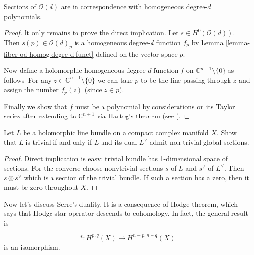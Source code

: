 \documentclass{book}
\begin{document}
\begin{theorem}
\label{theorem-secti-od-degre-d-homog-poly}
Sections of $\mathcal{O}(d)$ are in
correspondence with homogeneous degree-$d$
polynomials.
\end{theorem}

\begin{proof}
It only remains to prove the direct
implication.
Let $s \in H^0(\mathcal{O}(d))$.
Then $s(p) \in \mathcal{O}(d)_p$ is a
homogeneous degree-$d$ function $f_p$
by Lemma
\ref{lemma-fiber-od-homog-degre-d-funct}
defined on the vector space $p$.

Now define a holomorphic homogeneous
degree-$d$ function $f$ on
$\mathbb{C}^{n+1}\setminus\{0\}$ as follows.
For any $z \in
\mathbb{C}^{n+1}\setminus\{0\}$ we can take
$p$
to be the line passing through $z$
and assign the number $f_p(z)$
(since $z \in p$).

Finally we show that $f$ must be a polynomial
by considerations on its Taylor series
after extending to $\mathbb{C}^{n+1}$ via
Hartog's theorem
(see \cite[Theorem 3.36]{lec}).
\end{proof}


\begin{exercise}
\label{exercise-line-bundle-trivial-iff}
\begin{reference}
\cite[Exercise 2.2.5]{huc}
\end{reference}
Let $L$ be a holomorphic line bundle on a
compact complex manifold $X$.
Show that $L$ is trivial if and only if $L$
and its dual $L^\vee$
admit non-trivial global sections.
\end{exercise}

\begin{proof}
Direct implication is easy: trivial bundle
has 1-dimensional space of sections.
For the converse choose nonvtrivial sections
$s$ of $L$
and $s^\vee$ of $L^\vee$.
Then $s \otimes s^\vee$ which is a section
of the trivial bundle.
If such a section has a zero, then it must be
zero throughout $X$.
\end{proof}

\medskip\noindent
Now let's discuss Serre's duality.
It is a consequence of Hodge theorem,
which says that Hodge star operator descends
to cohomology.
In fact, the general result is

\begin{theorem}[Hodge]
\label{theorem-hodge-star-descends}$$
*: H^{p,q}(X) \longrightarrow H^{n-p,n-q}(X)
$$
is an isomorphism.
\end{theorem}
\end{document}
